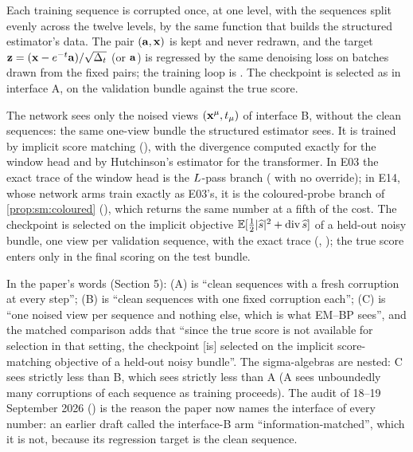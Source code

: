 \begin{definition}
\label{def:sm:B}
Each training sequence is corrupted once, at one level, with the sequences split
evenly across the twelve levels, by the same function 
that builds the structured estimator's data. The pair $(\mathbf{a},\mathbf{x})$ is kept and never
redrawn, and the target $\mathbf{z}=(\mathbf{x}-e^{-t}\mathbf{a})/\sqrt{\Delta_t}$ (or $\mathbf{a}$) is regressed by the
same denoising loss on batches drawn from the fixed pairs; the training loop is
. The
checkpoint is selected as in interface A, on the validation bundle against the true
score.
\end{definition}

\begin{definition}
\label{def:sm:C}
The network sees only the noised views $(\mathbf{x}^{\mu},t_\mu)$ of interface B, without the
clean sequences: the same one-view bundle the structured estimator sees. It is trained
by implicit score matching (), with the divergence computed exactly
for the window head and by Hutchinson's estimator for the transformer. In E03 the
exact trace of the window head is the $L$-pass branch
( with no  override); in E14, whose
network arms train exactly as E03's, it is the coloured-probe branch of
\cref{prop:sm:coloured} (), which returns the same number at a
fifth of the cost. The checkpoint is selected on the implicit
objective $\mathbb{E}[\tfrac12|\widehat s|^2+\operatorname{div}\widehat s]$ of a held-out
noisy bundle, one view per validation sequence, with the exact trace
(, ); the true score enters only in the
final scoring on the test bundle.
\end{definition}

In the paper's words (Section 5): (A) is ``clean sequences with a fresh corruption at
every step''; (B) is ``clean sequences with one fixed corruption each''; (C) is ``one
noised view per sequence and nothing else, which is what EM--BP sees'', and the
matched comparison adds that ``since the true score is not available for selection in
that setting, the checkpoint [is] selected on the implicit score-matching objective of
a held-out noisy bundle''. The sigma-algebras are nested: C sees strictly less than B,
which sees strictly less than A (A sees unboundedly many corruptions of each sequence
as training proceeds). The audit of 18--19 September 2026 ()
is the reason the paper now names the interface of every number: an earlier draft
called the interface-B arm ``information-matched'', which it is not, because its
regression target is the clean sequence.


